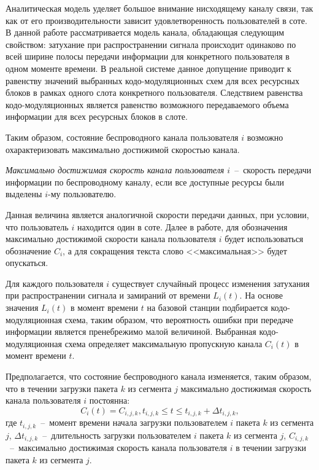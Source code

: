 Аналитическая модель уделяет большое внимание нисходящему каналу связи, так как от его производительности зависит удовлетворенность пользователей в соте. В данной работе рассматривается модель канала, обладающая следующим свойством: затухание при распространении сигнала происходит одинаково по всей ширине полосы передачи информации для конкретного пользователя в одном моменте времени. В реальной системе данное допущение приводит к равенству значений выбранных кодо-модуляционных схем для всех ресурсных блоков в рамках одного слота конкретного пользователя. Следствием равенства кодо-модуляционных является равенство возможного передаваемого объема информации для всех ресурсных блоков в слоте.

Таким образом, состояние беспроводного канала пользователя $i$ возможно охарактеризовать максимально достижимой скоростью канала.
\begin{definition}
\label{def:MaxThroughput}
    \emph{Максимально достижимая скорость канала пользователя $i$}~--~скорость передачи информации по беспроводному каналу, если все доступные ресурсы были выделены $i$-му пользователю.
\end{definition}
Данная величина является аналогичной скорости передачи данных, при условии, что пользователь $i$ находится один в соте. Далее в работе, для обозначения максимально достижимой скорости канала пользователя $i$ будет использоваться обозначение $C_i$, а для сокращения текста слово <<максимальная>> будет опускаться.

Для каждого пользователя $i$ существует случайный процесс изменения затухания при распространении сигнала и замираний от времени $L_i(t)$. На основе значения $L_i(t)$ в момент времени $t$ на базовой станции подбирается кодо-модуляционная схема, таким образом, что вероятность ошибки при передаче информации является пренебрежимо малой величиной. Выбранная кодо-модуляционная схема определяет максимальную пропускную канала $C_i(t)$ в момент времени $t$.

Предполагается, что состояние беспроводного канала изменяется, таким образом, что в течении загрузки пакета $k$ из сегмента $j$ максимально достижимая скорость канала пользователя $i$ постоянна:
\begin{equation}
C_i(t)=C_{i,j,k}, t_{i,j,k} \leq t \leq t_{i,j,k}+\Delta t_{i,j,k},
\label{eq:ChannelConst}
\end{equation}
где $t_{i,j,k}$~--~момент времени начала загрузки пользователем $i$ пакета $k$ из сегмента $j$, $\Delta t_{i,j,k}$~--~длительность загрузки пользователем $i$ пакета $k$ из сегмента $j$, $C_{i,j,k}$~--~максимально достижимая скорость канала пользователя $i$ в течении загрузки пакета $k$ из сегмента $j$.

